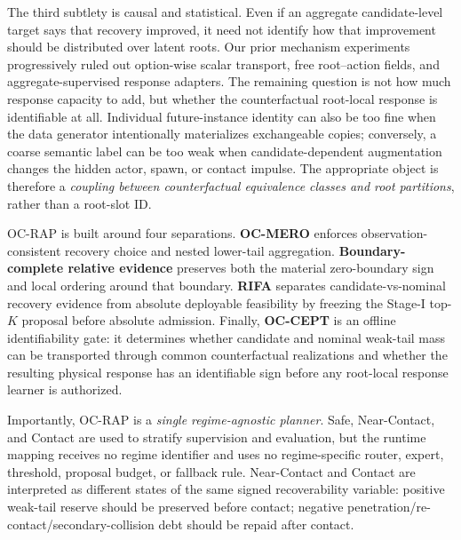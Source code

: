 \documentclass[conference]{IEEEtran}
\begin{document}
The third subtlety is causal and statistical. Even if an aggregate candidate-level target says that recovery improved, it need not identify how that improvement should be distributed over latent roots. Our prior mechanism experiments progressively ruled out option-wise scalar transport, free root--action fields, and aggregate-supervised response adapters. The remaining question is not how much response capacity to add, but whether the counterfactual root-local response is identifiable at all. Individual future-instance identity can also be too fine when the data generator intentionally materializes exchangeable copies; conversely, a coarse semantic label can be too weak when candidate-dependent augmentation changes the hidden actor, spawn, or contact impulse. The appropriate object is therefore a \emph{coupling between counterfactual equivalence classes and root partitions}, rather than a root-slot ID.

OC-RAP is built around four separations. \textbf{OC-MERO} enforces observation-consistent recovery choice and nested lower-tail aggregation. \textbf{Boundary-complete relative evidence} preserves both the material zero-boundary sign and local ordering around that boundary. \textbf{RIFA} separates candidate-vs-nominal recovery evidence from absolute deployable feasibility by freezing the Stage-I top-$K$ proposal before absolute admission. Finally, \textbf{OC-CEPT} is an offline identifiability gate: it determines whether candidate and nominal weak-tail mass can be transported through common counterfactual realizations and whether the resulting physical response has an identifiable sign before any root-local response learner is authorized.

Importantly, OC-RAP is a \emph{single regime-agnostic planner}. Safe, Near-Contact, and Contact are used to stratify supervision and evaluation, but the runtime mapping receives no regime identifier and uses no regime-specific router, expert, threshold, proposal budget, or fallback rule. Near-Contact and Contact are interpreted as different states of the same signed recoverability variable: positive weak-tail reserve should be preserved before contact; negative penetration/re-contact/secondary-collision debt should be repaid after contact.
\end{document}
